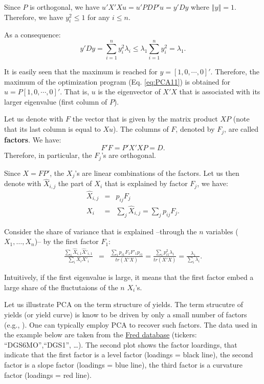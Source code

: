 \documentclass[
  12pt,
]{book}
\theoremstyle{definition}
\theoremstyle{definition}
\theoremstyle{definition}
\theoremstyle{definition}
\theoremstyle{remark}
\begin{document}
Since \(P\) is orthogonal, we have \(u'X'Xu=u'PDP'u=y'Dy\) where \(\left\Vert y\right\Vert =1\). Therefore, we have \(y_{i}^{2}\leq 1\) for any \(i\leq n\).

As a consequence:
\[
y'Dy=\sum_{i=1}^{n}y_{i}^{2}\lambda_{i}\leq\lambda_{1}\sum_{i=1}^{n}y_{i}^{2}=\lambda_{1}.
\]

It is easily seen that the maximum is reached for \(y=\left[1,0,\cdots,0\right]'\). Therefore, the maximum of the optimization program (Eq. \eqref{eq:PCA11}) is obtained for \(u=P\left[1,0,\cdots,0\right]'\). That is, \(u\) is the eigenvector of \(X'X\) that is associated with its larger eigenvalue (first column of \(P\)).

Let us denote with \(F\) the vector that is given by the matrix product \(XP\) (note that its last column is equal to \(Xu\)). The columns of \(F\), denoted by \(F_{j}\), are called \textbf{factors}. We have:
\[
F'F=P'X'XP=D.
\]
Therefore, in particular, the \(F_{j}\)'s are orthogonal.

Since \(X=FP'\), the \(X_{j}\)'s are linear combinations of the factors. Let us then denote with \(\hat{X}_{i,j}\) the part of \(X_{i}\) that is explained by factor \(F_{j}\), we have:
\begin{eqnarray*}
\hat{X}_{i,j} & = & p_{ij}F_{j}\\
X_{i} & = & \sum_{j}\hat{X}_{i,j}=\sum_{j}p_{ij}F_{j}.
\end{eqnarray*}

Consider the share of variance that is explained --through the \(n\) variables (\(X_{1},\ldots,X_{n}\))-- by the first factor \(F_{1}\):
\begin{eqnarray*}
\frac{\sum_{i}\hat{X}_{i,1}\hat{X}'_{i,1}}{\sum_{i}X_{i}X'_{i}} & = & \frac{\sum_{i}p_{i1}F_{1}F'_{1}p_{i1}}{tr(X'X)} = \frac{\sum_{i}p_{i1}^{2}\lambda_{1}}{tr(X'X)} = \frac{\lambda_{1}}{\sum_{i}\lambda_{i}}.
\end{eqnarray*}

Intuitively, if the first eigenvalue is large, it means that the first factor embed a large share of the fluctutaions of the \(n\) \(X_{i}\)'s.

Let us illustrate PCA on the term structure of yields. The term strucutre of yields (or yield curve) is know to be driven by only a small number of factors (e.g., \citet{Litterman_Scheinkman_1991}). One can typically employ PCA to recover such factors. The data used in the example below are taken from the \href{https://fred.stlouisfed.org}{Fred database} (tickers: ``DGS6MO'',``DGS1'', \ldots). The second plot shows the factor loardings, that indicate that the first factor is a level factor (loadings = black line), the second factor is a slope factor (loadings = blue line), the third factor is a curvature factor (loadings = red line).
\end{document}

